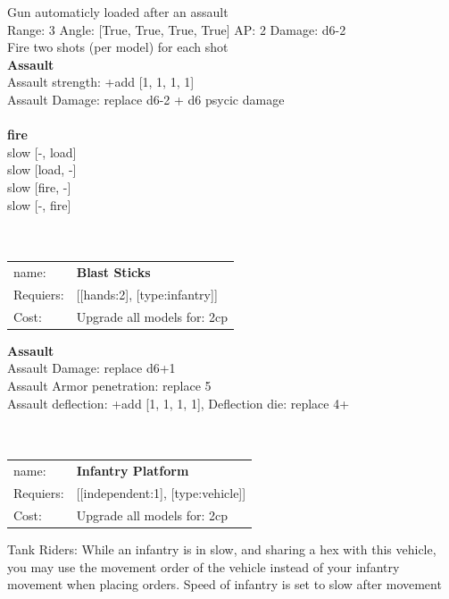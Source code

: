 Gun automaticly loaded after an assault\\ 


Range: 3  Angle: [True, True, True, True] AP: 2 Damage: d6-2 \\
Fire two shots (per model) for each shot\\ 



{\bf Assault} \ \\
Assault strength: +add [1, 1, 1, 1] 
\\ 
Assault Damage: replace d6-2 + d6 psycic damage
\\ 



\ \\ {\bf fire } \\
slow [-, load] \\
slow [load, -] \\
slow [fire, -] \\
slow [-, fire] \\

\ \\
\ \\
\begin{tabular}{ll}
name: & {\bf Blast Sticks } \\
Requiers: & [[hands:2], [type:infantry]] \\
Cost: & Upgrade all models for: 2cp \\
\end{tabular}





{\bf Assault} \ \\
Assault Damage: replace d6+1
\\ 
Assault Armor penetration: replace 5 
\\ 
Assault deflection: +add [1, 1, 1, 1], Deflection die: replace 4+
\\ 




\ \\
\ \\
\begin{tabular}{ll}
name: & {\bf Infantry Platform } \\
Requiers: & [[independent:1], [type:vehicle]] \\
Cost: & Upgrade all models for: 2cp \\
\end{tabular}

Tank Riders: While an infantry is in slow, and sharing a hex with this vehicle, you may use the movement order of the vehicle instead of your infantry movement when placing orders. Speed of infantry is set to slow after movement\\ 









